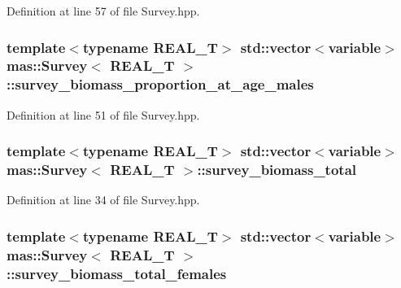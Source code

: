 Definition at line 57 of file Survey.\-hpp.

\hypertarget{structmas_1_1_survey_a81ba97fe092ee36ab133aa4416a883d4}{
\subsubsection[{survey\-\_\-biomass\-\_\-proportion\-\_\-at\-\_\-age\-\_\-males}]{\setlength{\rightskip}{0pt plus 5cm}template$<$typename R\-E\-A\-L\-\_\-\-T$>$ std\-::vector$<${\bf variable}$>$ {\bf mas\-::\-Survey}$<$ R\-E\-A\-L\-\_\-\-T $>$\-::survey\-\_\-biomass\-\_\-proportion\-\_\-at\-\_\-age\-\_\-males}}\label{structmas_1_1_survey_a81ba97fe092ee36ab133aa4416a883d4}


Definition at line 51 of file Survey.\-hpp.

\hypertarget{structmas_1_1_survey_ae17e461c7ac75c48a2dd5cd80d17d485}{
\subsubsection[{survey\-\_\-biomass\-\_\-total}]{\setlength{\rightskip}{0pt plus 5cm}template$<$typename R\-E\-A\-L\-\_\-\-T$>$ std\-::vector$<${\bf variable}$>$ {\bf mas\-::\-Survey}$<$ R\-E\-A\-L\-\_\-\-T $>$\-::survey\-\_\-biomass\-\_\-total}}\label{structmas_1_1_survey_ae17e461c7ac75c48a2dd5cd80d17d485}


Definition at line 34 of file Survey.\-hpp.

\hypertarget{structmas_1_1_survey_a2a3551f2c4083ca4ec39f40d2afc3dc5}{
\subsubsection[{survey\-\_\-biomass\-\_\-total\-\_\-females}]{\setlength{\rightskip}{0pt plus 5cm}template$<$typename R\-E\-A\-L\-\_\-\-T$>$ std\-::vector$<${\bf variable}$>$ {\bf mas\-::\-Survey}$<$ R\-E\-A\-L\-\_\-\-T $>$\-::survey\-\_\-biomass\-\_\-total\-\_\-females}}\label{structmas_1_1_survey_a2a3551f2c4083ca4ec39f40d2afc3dc5}


